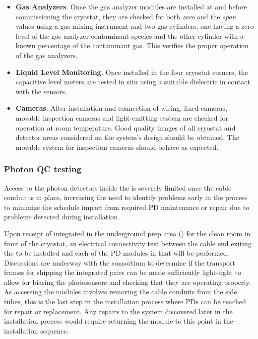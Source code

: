 \begin{itemize}
\item {\bf Gas Analyzers}. Once the gas analyzer modules are installed at \surf and before commissioning the cryostat, they 
are checked for both \textit{zero} and the \textit{span} values using a gas-mixing instrument and two gas cylinders, one having a
zero level of the gas analyzer contaminant species and the other cylinder with a known percentage of the contaminant gas. This
 verifies the proper operation of the gas analyzers. 

\item {\bf Liquid Level Monitoring.} Once installed in the four cryostat corners, the capacitive level meters are tested in situ 
using a suitable dielectric in contact with the sensors.

\item {\bf Cameras}. After installation and connection of wiring, fixed cameras, movable inspection cameras and light-emitting system are checked for operation at room temperature. Good quality images of all cryostat and detector areas considered on the system's design should be obtained. The movable system for inspection cameras should behave as expected.  
\end{itemize}

\subsubsection{Photon QC testing}

Access to the photon detectors inside the  is severely limited once the  cable conduit is in place, increasing the need to identify problems early in the process to minimize the schedule impact from required PD maintenance or repair due to problems detected during installation.

Upon receipt of integrated  in the underground prep area () for the clean room in front of the cryostat, an electrical connectivity test between the cable end exiting the  to be installed and each of the PD modules in that  will be performed.  Discussions are underway with the  consortium to determine if the transport frames for shipping the integrated  pairs can be made sufficiently light-tight to allow for biasing the photosensors and checking that they are operating properly.  As accessing the  modules involves removing the  cable conduits from the  side tubes, this is the last step in the installation process where PDs can be reached for repair or replacement.  Any repairs to the  system discovered later in the installation process would require returning the  module to this point in the installation sequence.

